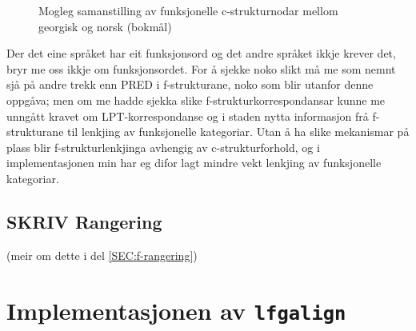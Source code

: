 \documentclass[11pt,a4paper,oneside,draft]{book}
\begin{document}
  \begin{figure}[htp]
   \centering
  
  \caption{Mogleg samanstilling av funksjonelle c-strukturnodar mellom georgisk og norsk (bokmål)}
   \label{fig:fnord}
  \end{figure}

Der det eine språket har eit funksjonsord og det andre språket ikkje
krever det, bryr me oss ikkje om funksjonsordet. For å sjekke noko
slikt må me som nemnt sjå på andre trekk enn PRED i f-strukturane,
noko som blir utanfor denne oppgåva; men om me hadde sjekka slike
f-strukturkorrespondansar kunne me unngått kravet om
LPT-korrespondanse og i staden nytta informasjon frå f-strukturane til
lenkjing av funksjonelle kategoriar. Utan å ha slike mekanismar på
plass blir f-strukturlenkjinga avhengig av c-strukturforhold, og i
implementasjonen min har eg difor lagt mindre vekt lenkjing av
funksjonelle kategoriar.

\section{\textbf{SKRIV} Rangering}
\label{sec-3.9}

(meir om dette i del \ref{SEC:f-rangering})

\chapter{Implementasjonen av \texttt{lfgalign}}
\label{sec-4}

\label{SEC:implementasjon}
\end{document}
